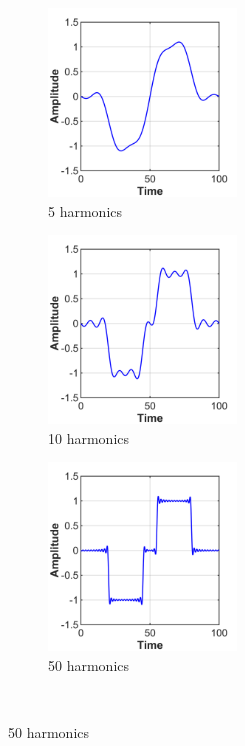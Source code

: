 \begin{figure}[p]
    \centering
    \begin{subfigure}[t]{0.33\textwidth}
        \centering
        \includegraphics[width=5cm]{Simulations/TimeDep/square_biphasic_N5}
        \caption{5 harmonics}
        \label{fig:biphasic_conv_sq_5}
    \end{subfigure}%
	\hfill%
	\begin{subfigure}[t]{0.33\textwidth}
        \centering
        \includegraphics[width=5cm]{Simulations/TimeDep/square_biphasic_N10}
        \caption{10 harmonics}
        \label{fig:biphasic_conv_sq_10}
    \end{subfigure}%
    \hfill%
    \begin{subfigure}[t]{0.33\textwidth}
        \centering
        \includegraphics[width=5cm]{Simulations/TimeDep/square_biphasic_N50}
        \caption{50 harmonics}
        \label{fig:biphasic_conv_sq_50}
    \end{subfigure}\\%
    \vspace{1em}%

\end{figure}
